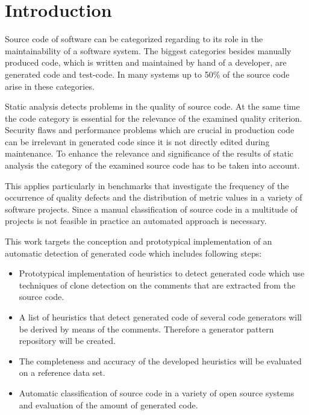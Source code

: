 
\chapter{Introduction}\label{chapter:introduction}

Source code of software can be categorized regarding to its role in the maintainability of a software system. The biggest categories besides manually produced code, which is written and maintained by hand of a developer, are generated code and test-code. In many systems up to 50\% of the source code arise in these categories.

Static analysis detects problems in the quality of source code. At the same time the code category is essential for the relevance of the examined quality criterion. Security flaws and performance problems which are crucial in production code can be irrelevant in generated code since it is not directly edited during maintenance. To enhance the relevance and significance of the results of static analysis the category of the examined source code has to be taken into account.

This applies particularly in benchmarks that investigate the frequency of the occurrence of quality defects and the distribution of metric values in a variety of software projects. Since a manual classification of source code in a multitude of projects is not feasible in practice an automated approach is necessary.

This work targets the conception and prototypical implementation of an automatic detection of generated code which includes following steps:

\begin{itemize}
	\item Prototypical implementation of heuristics to detect generated code which use techniques of clone detection on the comments that are extracted from the source code.
	\item A list of heuristics that detect generated code of several code generators will be derived by means of the comments. Therefore a generator pattern repository will be created.
	\item The completeness and accuracy of the developed heuristics will be evaluated on a reference data set.
	\item Automatic classification of source code in a variety of open source systems and evaluation of the amount of generated code. 
\end{itemize}